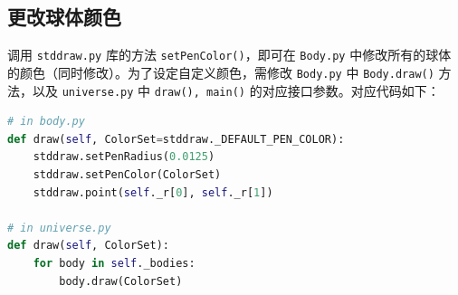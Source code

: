\documentclass[]{report}
\begin{document}
		\subsection{更改球体颜色}
		调用 \verb|stddraw.py| 库的方法 \verb|setPenColor()|，即可在 \verb|Body.py| 中修改所有的球体的颜色（同时修改）。为了设定自定义颜色，需修改 \verb|Body.py| 中 \verb|Body.draw()| 方法，以及 \verb|universe.py| 中 \verb|draw(), main()| 的对应接口参数。对应代码如下：
		\begin{lstlisting}[language=python, basicstyle=\monaco]
# in body.py
def draw(self, ColorSet=stddraw._DEFAULT_PEN_COLOR):
	stddraw.setPenRadius(0.0125)
	stddraw.setPenColor(ColorSet)
	stddraw.point(self._r[0], self._r[1])

# in universe.py
def draw(self, ColorSet):
	for body in self._bodies:
		body.draw(ColorSet)
		\end{lstlisting}
\end{document}

